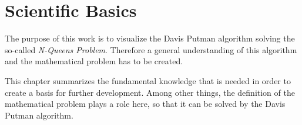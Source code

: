

\chapter{Scientific Basics}
The purpose of this work is to visualize the Davis Putman algorithm solving the so-called \textit{N-Queens Problem}. 
Therefore a general understanding of this algorithm and the mathematical problem has to be created.

This chapter summarizes the fundamental knowledge that is needed in order to create a basis for further development. 
Among other things, the definition of the mathematical problem plays a role here, so that it can be solved by the Davis Putman algorithm.

